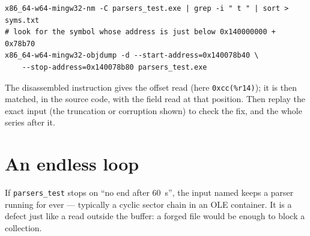 \documentclass[11pt,a4paper,oneside]{report}
\begin{document}
\begin{lstlisting}
x86_64-w64-mingw32-nm -C parsers_test.exe | grep -i " t " | sort > syms.txt
# look for the symbol whose address is just below 0x140000000 + 0x78b70
x86_64-w64-mingw32-objdump -d --start-address=0x140078b40 \
    --stop-address=0x140078b80 parsers_test.exe
\end{lstlisting}

The disassembled instruction gives the offset read (here \texttt{0xcc(\%r14)});
it is then matched, in the source code, with the field read at that position.
Then replay the exact input (the truncation or corruption shown) to check the
fix, and the whole series after it.

\section{An endless loop}

If \texttt{parsers\_test} stops on ``no end after 60~s'', the input named keeps a
parser running for ever — typically a cyclic sector chain in an OLE container.
It is a defect just like a read outside the buffer: a forged file would be
enough to block a collection.
\end{document}
